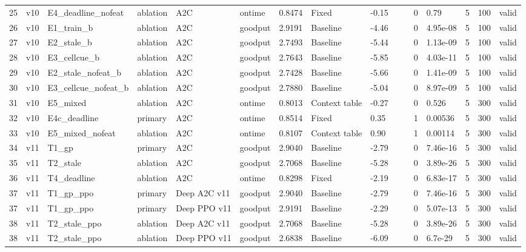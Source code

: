 \documentclass[10pt]{article}
\begin{document}
\begin{landscape}
\begin{longtable}{@{}llllllllllllllll@{}}
25 & v10 & E4\_deadline\_nofeat & ablation & A2C & ontime & 0.8474 & Fixed & -0.15 &  &  & 0 & 0.79 & 5 & 100 & valid \\
26 & v10 & E1\_train\_b & ablation & A2C & goodput & 2.9191 & Baseline & -4.46 &  &  & 0 & 4.95e-08 & 5 & 100 & valid \\
27 & v10 & E2\_stale\_b & ablation & A2C & goodput & 2.7493 & Baseline & -5.44 &  &  & 0 & 1.13e-09 & 5 & 100 & valid \\
28 & v10 & E3\_cellcue\_b & ablation & A2C & goodput & 2.7643 & Baseline & -5.85 &  &  & 0 & 4.03e-11 & 5 & 100 & valid \\
29 & v10 & E2\_stale\_nofeat\_b & ablation & A2C & goodput & 2.7428 & Baseline & -5.66 &  &  & 0 & 1.41e-09 & 5 & 100 & valid \\
30 & v10 & E3\_cellcue\_nofeat\_b & ablation & A2C & goodput & 2.7880 & Baseline & -5.04 &  &  & 0 & 8.97e-09 & 5 & 100 & valid \\
31 & v10 & E5\_mixed & ablation & A2C & ontime & 0.8013 & Context table & -0.27 &  &  & 0 & 0.526 & 5 & 300 & valid \\
32 & v10 & E4c\_deadline & primary & A2C & ontime & 0.8514 & Fixed & 0.35 &  &  & 1 & 0.00536 & 5 & 300 & valid \\
33 & v10 & E5\_mixed\_nofeat & ablation & A2C & ontime & 0.8107 & Context table & 0.90 &  &  & 1 & 0.00114 & 5 & 300 & valid \\
34 & v11 & T1\_gp & primary & A2C & goodput & 2.9040 & Baseline & -2.79 &  &  & 0 & 7.46e-16 & 5 & 300 & valid \\
35 & v11 & T2\_stale & ablation & A2C & goodput & 2.7068 & Baseline & -5.28 &  &  & 0 & 3.89e-26 & 5 & 300 & valid \\
36 & v11 & T4\_deadline & ablation & A2C & ontime & 0.8298 & Fixed & -2.19 &  &  & 0 & 6.83e-17 & 5 & 300 & valid \\
37 & v11 & T1\_gp\_ppo & primary & Deep A2C v11 & goodput & 2.9040 & Baseline & -2.79 &  &  & 0 & 7.46e-16 & 5 & 300 & valid \\
37 & v11 & T1\_gp\_ppo & primary & Deep PPO v11 & goodput & 2.9191 & Baseline & -2.29 &  &  & 0 & 5.07e-13 & 5 & 300 & valid \\
38 & v11 & T2\_stale\_ppo & ablation & Deep A2C v11 & goodput & 2.7068 & Baseline & -5.28 &  &  & 0 & 3.89e-26 & 5 & 300 & valid \\
38 & v11 & T2\_stale\_ppo & ablation & Deep PPO v11 & goodput & 2.6838 & Baseline & -6.09 &  &  & 0 & 6.7e-29 & 5 & 300 & valid \\

\end{longtable}
\end{landscape}
\end{document}
